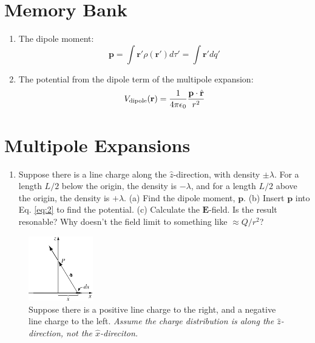 \documentclass[12pt]{article}
\begin{document}
\maketitle

\section{Memory Bank}

\begin{enumerate}
\item The dipole moment:
\begin{equation}
\mathbf{p} = \int \mathbf{r}' \rho(\mathbf{r}') d\tau' = \int \mathbf{r}' dq'
\end{equation}
\item The potential from the dipole term of the multipole expansion:
\begin{equation}
V_{\rm dipole}(\mathbf{r}) = \frac{1}{4\pi\epsilon_0} \frac{\mathbf{p} \cdot \hat{\mathbf{r}}}{r^2} \label{eq:2}
\end{equation}
\end{enumerate}

\section{Multipole Expansions}

\begin{enumerate}
\item Suppose there is a line charge along the $\hat{z}$-direction, with density $\pm\lambda$.  For a length $L/2$ below the origin, the density is $-\lambda$, and for a length $L/2$ above the origin, the density is $+\lambda$.  (a) Find the dipole moment, $\mathbf{p}$.  (b) Insert $\mathbf{p}$ into Eq. \ref{eq:2} to find the potential. (c) Calculate the $\mathbf{E}$-field.  Is the result resonable?  Why doesn't the field limit to something like $\approx Q/r^2$?
\end{enumerate}

\begin{figure}
\centering
\includegraphics[width=0.25\textwidth]{figures/2_6.jpg}
\caption{\label{fig:1} Suppose there is a positive line charge to the right, and a negative line charge to the left.  \textit{Assume the charge distribution is along the $\hat{z}$-direction, not the $\hat{x}$-direciton.}}
\end{figure}
\end{document}
